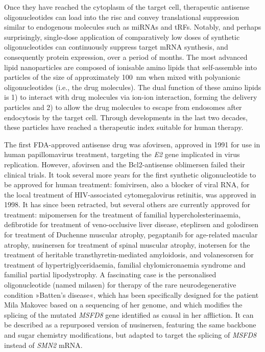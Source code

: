 Once they have reached the cytoplasm of the target cell, therapeutic antisense oligonucleotides can load into the \acf{risc} and convey translational suppression similar to endogenous molecules such as miRNAs and tRFs. Notably, and perhaps surprisingly, single-dose application of comparatively low doses of synthetic oligonucleotides can continuously suppress target mRNA synthesis, and consequently protein expression, over a period of months.\cite{Raal2020} The most advanced lipid nanoparticles are composed of ionisable amino lipids that self-assemble into particles of the size of approximately \SI{100}{\nano\metre} when mixed with polyanionic oligonucleotides (i.e., the drug molecules).\cite{Akhtar2007} The dual function of these amino lipids is 1) to interact with drug molecules via ion-ion interaction, forming the delivery particles and 2) to allow the drug molecules to escape from endosomes after endocytosis by the target cell. Through developments in the last two decades, these particles have reached a therapeutic index suitable for human therapy.\cite{Jayaraman2012, Raal2020}

The first FDA-approved antisense drug was afovirsen, approved in 1991 for use in human papillomavirus treatment, targeting the \emph{E2} gene implicated in virus replication. However, afovirsen and the Bcl2-antisense oblimersen failed their clinical trials. It took several more years for the first synthetic oligonucleotide to be approved for human treatment: fomivirsen, also a blocker of viral RNA, for the local treatment of HIV-associated cytomegalovirus retinitis, was approved in 1998.\cite{Piascik1999} It has since been retracted, but several others are currently approved for treatment: mipomersen for the treatment of familial hypercholesterinaemia, defibrotide for treatment of veno-occlusive liver disease, eteplirsen and golodirsen for treatment of Duchenne muscular atrophy, pegaptanib for age-related macular atrophy, nusinersen for treatment of spinal muscular atrophy, inotersen for the treatment of heritable transthyretin-mediated amyloidosis, and volanesorsen for treatment of hypertriglyceridaemia, familial chylomicronaemia syndrome and familial partial lipodystrophy.\cite{Sharad2019, Wang2020} A fascinating case is the personalised oligonucleotide (named milasen) for therapy of the rare neurodegenerative condition »Batten's disease«, which has been specifically designed for the patient Mila Makovec based on a sequencing of her genome, and which modifies the splicing of the mutated \emph{MSFD8} gene identified as causal in her affliction.\cite{Kim2019} It can be described as a repurposed version of nusinersen, featuring the same backbone and sugar chemistry modifications, but adapted to target the splicing of \emph{MSFD8} instead of \emph{SMN2} mRNA.

